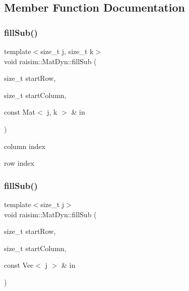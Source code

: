 \subsection{Member Function Documentation}
\mbox{\label{classraisim_1_1MatDyn_a1dc88bef6db9b8e02b9bda77a5403d80}} 
\subsubsection{\texorpdfstring{fill\+Sub()}{fillSub()}\hspace{0.1cm}{\footnotesize\ttfamily [1/2]}}
{\footnotesize\ttfamily template$<$size\+\_\+t j, size\+\_\+t k$>$ \\
void raisim\+::\+Mat\+Dyn\+::fill\+Sub (\begin{DoxyParamCaption}\item[{size\+\_\+t}]{start\+Row,  }\item[{size\+\_\+t}]{start\+Column,  }\item[{const Mat$<$ j, k $>$ \&}]{in }\end{DoxyParamCaption})\hspace{0.3cm}{\ttfamily [inline]}}

column index

row index \mbox{\label{classraisim_1_1MatDyn_a09fbfebf894fb204d71227e8662d0f9c}} 
\subsubsection{\texorpdfstring{fill\+Sub()}{fillSub()}\hspace{0.1cm}{\footnotesize\ttfamily [2/2]}}
{\footnotesize\ttfamily template$<$size\+\_\+t j$>$ \\
void raisim\+::\+Mat\+Dyn\+::fill\+Sub (\begin{DoxyParamCaption}\item[{size\+\_\+t}]{start\+Row,  }\item[{size\+\_\+t}]{start\+Column,  }\item[{const Vec$<$ j $>$ \&}]{in }\end{DoxyParamCaption})\hspace{0.3cm}{\ttfamily [inline]}}


